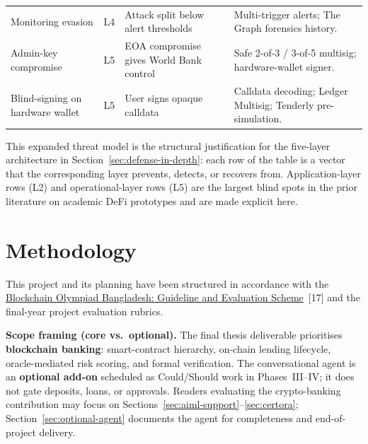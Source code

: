 \documentclass[12pt,a4paper]{report}
\begin{document}
\begin{table}[H]
\begin{tabular}{@{}p{2.3cm}p{1.1cm}p{3.6cm}p{5.8cm}@{}}
\rowcolor{RowShade}
Monitoring evasion & L4 & Attack split below alert thresholds & Multi-trigger alerts; The Graph forensics history. \\
Admin-key compromise & L5 & EOA compromise gives World Bank control & Safe 2-of-3 / 3-of-5 multisig; hardware-wallet signer. \\
\rowcolor{RowShade}
Blind-signing on hardware wallet & L5 & User signs opaque calldata & Calldata decoding; Ledger Multisig; Tenderly pre-simulation. \\
\bottomrule
\end{tabular}
\end{table}

This expanded threat model is the structural justification for the five-layer architecture in Section~\ref{sec:defense-in-depth}: each row of the table is a vector that the corresponding layer prevents, detects, or recovers from. Application-layer rows (L2) and operational-layer rows (L5) are the largest blind spots in the prior literature on academic DeFi prototypes and are made explicit here.


\chapter{Methodology}

This project and its planning have been structured in accordance with the \href{https://bcolbd.org/uploads/guideline/BLOCKCHAIN\%20OLYMPIAD\%20BANGLADESH\%20Blockchain\%20Guideline.pdf}{Blockchain Olympiad Bangladesh: Guideline and Evaluation Scheme}~[17] and the final-year project evaluation rubrics.

\noindent\textbf{Scope framing (core vs.\ optional).} The final thesis deliverable prioritises \textbf{blockchain banking}: smart-contract hierarchy, on-chain lending lifecycle, oracle-mediated risk scoring, and formal verification. The conversational agent is an \textbf{optional add-on} scheduled as Could/Should work in Phases~III--IV; it does not gate deposits, loans, or approvals. Readers evaluating the crypto-banking contribution may focus on Sections~\ref{sec:aiml-support}--\ref{sec:certora}; Section~\ref{sec:optional-agent} documents the agent for completeness and end-of-project delivery.
\end{document}
